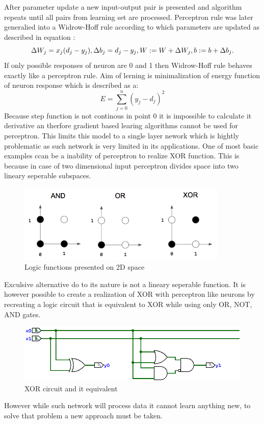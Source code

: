 After parameter update a new input-output pair is presented and algorithm repeats until all 
pairs from learning set are processed.
Perceptron rule was later generalied into a Widrow-Hoff rule according to which parameters are 
updated as described in equation :
\begin{equation}
	\Delta W_{j} = x_{j}(d_{j}-y_{j}),\\
	\Delta b_{j} = d_{j} - y_{j},\\
	W :=  W + \Delta W_{j},\\
	b := b + \Delta b_{j}.
\end{equation}
If only possible responses of neuron are 0 and 1 then Widrow-Hoff rule behaves exactly like a
perceptron rule.
Aim of lerning is minimalization of energy function of neuron response which is described as a:
\begin{equation}
	E = \sum_{j=0}^{n}(y_{j}-d_{j})^{2}
\end{equation}
Because step function is not continous in point 0 it is impossible to calculate it derivative
an therfore gradient based learing algorithms cannot be used for perceptron.
This limits this model to a single layer nework which is hightly problematic as such network
is very limited in its applications.
One of most basic examples ccan be a inability of perceptron to realize XOR function.
This is because in case of two dimensional input perceptron divides space into two lineary
seperable subspaces.
\begin{figure}[ht] 
	\centering
	\includegraphics[width=10cm]{res/logic_neuron}
	\caption{Logic functions presented on 2D space}
	\label{fig:logic_neuron}
\end{figure}
Exculsive alternative do to its nature is not a lineary seperable function. It is however
possible to create a realization of XOR with perceptron like neurons by recreating a logic
circuit that is equivalent to XOR while using only OR, NOT, AND gates.
\begin{figure}[ht] 
	\centering
	\includegraphics[width=\textwidth]{res/xor_circ}
	\caption{XOR circuit and it equivalent}
	\label{fig:xor_circ}
\end{figure}
However while such network will process data it cannot learn anything new, to solve that 
problem a new approach must be taken.


